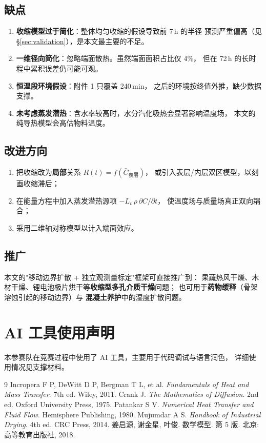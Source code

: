 \documentclass[withoutpreface,bwprint]{cumcmthesis}
\begin{document}
\subsection{缺点}
\begin{enumerate}
  \item \textbf{收缩模型过于简化}：整体均匀收缩的假设导致前 7\,h 的半径
        预测严重偏高（见 \S\ref{sec:validation}），是本文最主要的不足。
  \item \textbf{一维径向简化}：忽略端面散热。虽然端面面积占比仅 4\%，
        但在 72\,h 的长时程中累积误差仍可能可观。
  \item \textbf{恒温段环境假设}：附件 1 只覆盖 240\,min，
        之后的环境按终值外推，缺少数据支撑。
  \item \textbf{未考虑蒸发潜热}：含水率较高时，水分汽化吸热会显著影响温度场，
        本文的纯导热模型会高估物料温度。
\end{enumerate}

\subsection{改进方向}
\begin{enumerate}
  \item 把收缩改为\textbf{局部}关系 $R(t)=f(\bar C_{\text{表层}})$，
        或引入表层/内层双区模型，以刻画收缩滞后；
  \item 在能量方程中加入蒸发潜热源项 $-L_v\,\rho\,{\partial C}/{\partial t}$，
        使温度场与质量场真正双向耦合；
  \item 采用二维轴对称模型以计入端面效应。
\end{enumerate}

\subsection{推广}
本文的"移动边界扩散 + 独立观测量标定"框架可直接推广到：
果蔬热风干燥、木材干燥、锂电池极片烘干等\textbf{收缩型多孔介质干燥}问题；
也可用于\textbf{药物缓释}（骨架溶蚀引起的移动边界）与
\textbf{混凝土养护}中的湿度扩散问题。

\section*{AI 工具使用声明}
本参赛队在竞赛过程中使用了 AI 工具，主要用于代码调试与语言润色，
详细使用情况见支撑材料。

\begin{thebibliography}{9}
   Incropera F P, DeWitt D P, Bergman T L, et al.
    \textit{Fundamentals of Heat and Mass Transfer}. 7th ed. Wiley, 2011.
   Crank J. \textit{The Mathematics of Diffusion}. 2nd ed.
    Oxford University Press, 1975.
   Patankar S V. \textit{Numerical Heat Transfer and Fluid Flow}.
    Hemisphere Publishing, 1980.
   Mujumdar A S. \textit{Handbook of Industrial Drying}. 4th ed.
    CRC Press, 2014.
   姜启源, 谢金星, 叶俊. 数学模型. 第 5 版. 北京: 高等教育出版社, 2018.
\end{thebibliography}
\end{document}
